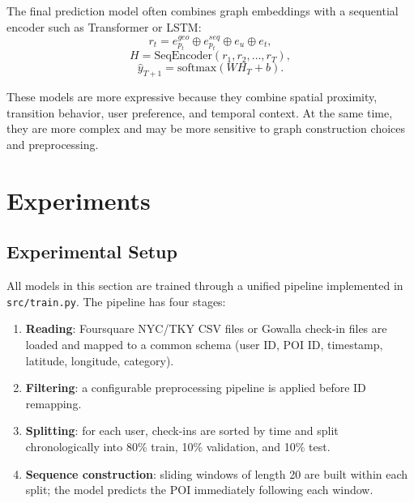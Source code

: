\documentclass[12pt, journal]{IEEEtran}
\begin{document}
The final prediction model often combines graph embeddings with a sequential encoder such as Transformer or LSTM:
\begin{equation}
    r_t = e_{p_t}^{geo} \oplus e_{p_t}^{seq} \oplus e_u \oplus e_t,
\end{equation}
\begin{equation}
    H = \mathrm{SeqEncoder}(r_1,r_2,\ldots,r_T),
\end{equation}
\begin{equation}
    \hat{y}_{T+1} = \mathrm{softmax}(W H_T + b).
\end{equation}

These models are more expressive because they combine spatial proximity, transition behavior, user preference, and temporal context. At the same time, they are more complex and may be more sensitive to graph construction choices and preprocessing.

\section{Experiments}

\subsection{Experimental Setup}

All models in this section are trained through a unified pipeline implemented in \texttt{src/train.py}. The pipeline has four stages:
\begin{enumerate}
    \item \textbf{Reading}: Foursquare NYC/TKY CSV files or Gowalla check-in files are loaded and mapped to a common schema (user ID, POI ID, timestamp, latitude, longitude, category).
    \item \textbf{Filtering}: a configurable preprocessing pipeline is applied before ID remapping.
    \item \textbf{Splitting}: for each user, check-ins are sorted by time and split chronologically into 80\% train, 10\% validation, and 10\% test.
    \item \textbf{Sequence construction}: sliding windows of length 20 are built within each split; the model predicts the POI immediately following each window.
\end{enumerate}
\end{document}
